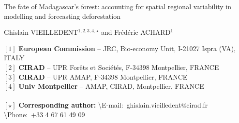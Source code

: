 \begin{center}
  \LARGE{The fate of Madagascar's forest: accounting for spatial regional variability
    in modelling and forecasting deforestation}
\end{center}

\vspace{1cm}

\begin{center}
  \large{Ghislain VIEILLEDENT$^{1,2,3,4,\star}$ and Frédéric ACHARD$^{1}$}
\end{center}

\vspace{1cm}

{\small
  \begin{flushleft}  
    $[1]$ \textbf{European Commission} -- JRC, Bio-economy Unit, I-21027 Ispra (VA), ITALY\\
    $[2]$ \textbf{CIRAD} -- UPR Forêts et Sociétés, F-34398 Montpellier, FRANCE\\
    $[3]$ \textbf{CIRAD} -- UPR AMAP, F-34398 Montpellier, FRANCE\\
    $[4]$ \textbf{Univ Montpellier} -- AMAP, CIRAD, Montpellier, FRANCE\\
    ~\\
    $[\star]$ \textbf{Corresponding author:}
    \textbackslash{E-mail}:~ghislain.vieilledent@cirad.fr
    \textbackslash{Phone}:~+33 4 67 61 49 09\\
  \end{flushleft}}
\newpage